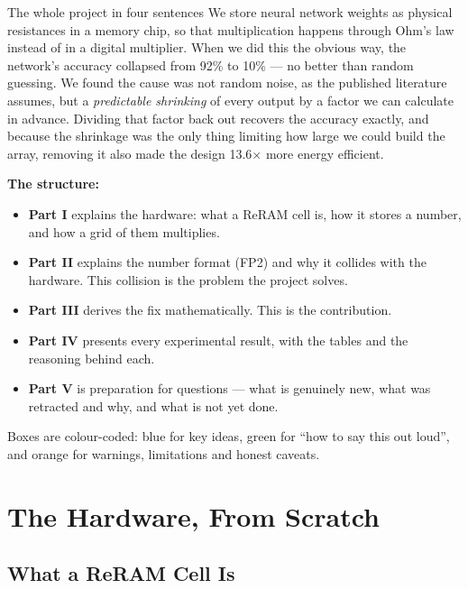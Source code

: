 \documentclass[11pt,a4paper]{report}
\begin{document}
\begin{keybox}{The whole project in four sentences}
We store neural network weights as physical resistances in a memory chip, so
that multiplication happens through Ohm's law instead of in a digital
multiplier. When we did this the obvious way, the network's accuracy
collapsed from 92\% to 10\% --- no better than random guessing. We found the
cause was not random noise, as the published literature assumes, but a
\emph{predictable shrinking} of every output by a factor we can calculate in
advance. Dividing that factor back out recovers the accuracy exactly, and
because the shrinkage was the only thing limiting how large we could build the
array, removing it also made the design 13.6$\times$ more energy efficient.
\end{keybox}

\noindent\textbf{The structure:}

\begin{itemize}[leftmargin=1.4em]
  \item \textbf{Part I} explains the hardware: what a ReRAM cell is, how it
        stores a number, and how a grid of them multiplies.
  \item \textbf{Part II} explains the number format (FP2) and why it collides
        with the hardware. This collision is the problem the project solves.
  \item \textbf{Part III} derives the fix mathematically. This is the
        contribution.
  \item \textbf{Part IV} presents every experimental result, with the tables
        and the reasoning behind each.
  \item \textbf{Part V} is preparation for questions --- what is genuinely
        new, what was retracted and why, and what is not yet done.
\end{itemize}

\noindent Boxes are colour-coded: \textcolor{acc}{blue} for key ideas,
\textcolor{good}{green} for ``how to say this out loud'', and
\textcolor{warm}{orange} for warnings, limitations and honest caveats.

\tableofcontents

\part{The Hardware, From Scratch}
\chapter{What a ReRAM Cell Is}
\end{document}
